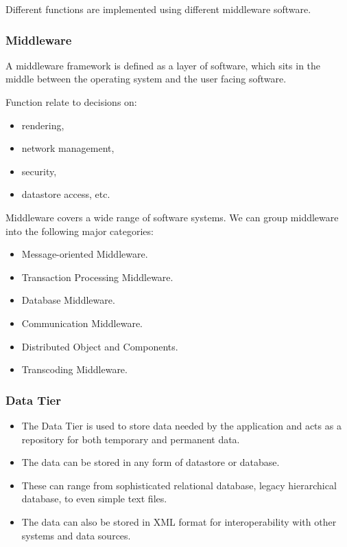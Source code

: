 Different functions are implemented using different middleware software.
\subsubsection*{Middleware}

A middleware framework is defined as a layer of software, which sits in the middle between the operating system and the user facing software.

Function relate to decisions on: 
\begin{multicols}{2}
	\begin{itemize}
		\item rendering, 
		\item network management, 
		\item security, 
		\item datastore access, etc.
	\end{itemize}
\end{multicols}

Middleware covers a wide range of software systems. We can group middleware into the following major categories:
\begin{multicols}{2}
	\begin{itemize}
		\item Message-oriented Middleware.
		\item Transaction Processing Middleware.
		\item Database Middleware.
		\item Communication Middleware.
		\item Distributed Object and Components.
		\item Transcoding Middleware.
	\end{itemize}
\end{multicols}



\begin{multicols}{2}
	\subsubsection{Data Tier}
	\begin{itemize}
		\item The Data Tier is used to store data needed by the application and acts as a repository for both temporary and permanent data. 
		\item The data can be stored in any form of datastore or database.
		\item These can range from sophisticated relational database, legacy hierarchical database, to even simple text files. 
		\item The data can also be stored in XML format for interoperability with other systems and	data sources. 
	\end{itemize}
\end{multicols}



